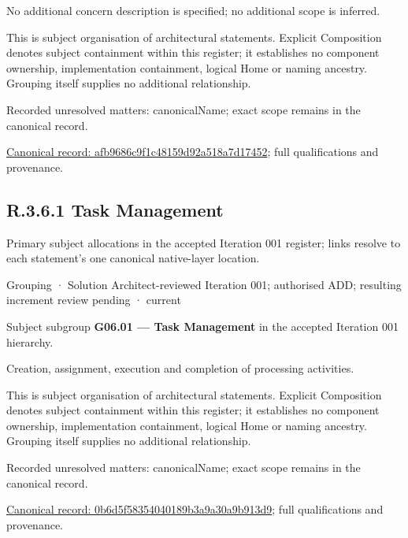 No additional concern description is specified; no additional scope is inferred.



This is subject organisation of architectural statements. Explicit Composition denotes subject containment within this register; it establishes no component ownership, implementation containment, logical Home or naming ancestry. Grouping itself supplies no additional relationship.


{\small Recorded unresolved matters: canonicalName; exact scope remains in the canonical record.}\par
{\footnotesize \href{../../../../continuum/grouping/afb9686c9f1c48159d92a518a7d17452.md}{Canonical record: afb9686c9f1c48159d92a518a7d17452}; full qualifications and provenance.}\par
\subsection*{R.3.6.1 Task Management}
\label{navigation:R.3.6.1}

Primary subject allocations in the accepted Iteration 001 register; links resolve to each statement’s one canonical native-layer location.\par
\label{element:0b6d5f58354040189b3a9a30a9b913d9}
{\small Grouping · Solution Architect-reviewed Iteration 001; authorised ADD; resulting increment review pending · current}\par

Subject subgroup \textbf{G06.01 — Task Management} in the accepted Iteration 001 hierarchy.



Creation, assignment, execution and completion of processing activities.



This is subject organisation of architectural statements. Explicit Composition denotes subject containment within this register; it establishes no component ownership, implementation containment, logical Home or naming ancestry. Grouping itself supplies no additional relationship.


{\small Recorded unresolved matters: canonicalName; exact scope remains in the canonical record.}\par
{\footnotesize \href{../../../../continuum/grouping/0b6d5f58354040189b3a9a30a9b913d9.md}{Canonical record: 0b6d5f58354040189b3a9a30a9b913d9}; full qualifications and provenance.}\par
